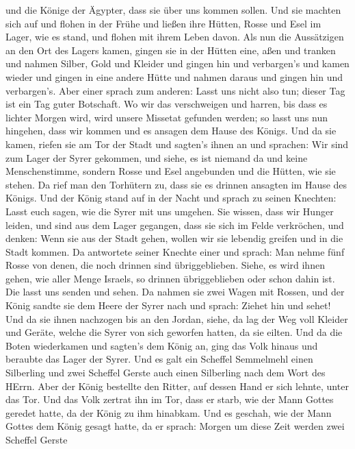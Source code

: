 und die Könige der Ägypter, dass sie über uns kommen sollen.
 Und sie machten sich auf und flohen in der Frühe und ließen
ihre Hütten, Rosse und Esel im Lager, wie es stand, und flohen mit ihrem
Leben davon.  Als nun die Aussätzigen an den Ort des Lagers
kamen, gingen sie in der Hütten eine, aßen und tranken und nahmen
Silber, Gold und Kleider und gingen hin und verbargen's und kamen wieder
und gingen in eine andere Hütte und nahmen daraus und gingen hin und
verbargen's.  Aber einer sprach zum anderen: Lasst uns nicht
also tun; dieser Tag ist ein Tag guter Botschaft. Wo wir das
verschweigen und harren, bis dass es lichter Morgen wird, wird unsere
Missetat gefunden werden; so lasst uns nun hingehen, dass wir kommen und
es ansagen dem Hause des Königs.  Und da sie kamen, riefen
sie am Tor der Stadt und sagten's ihnen an und sprachen: Wir sind zum
Lager der Syrer gekommen, und siehe, es ist niemand da und keine
Menschenstimme, sondern Rosse und Esel angebunden und die Hütten, wie
sie stehen.  Da rief man den Torhütern zu, dass sie es
drinnen ansagten im Hause des Königs.  Und der König stand
auf in der Nacht und sprach zu seinen Knechten: Lasst euch sagen, wie
die Syrer mit uns umgehen. Sie wissen, dass wir Hunger leiden, und sind
aus dem Lager gegangen, dass sie sich im Felde verkröchen, und denken:
Wenn sie aus der Stadt gehen, wollen wir sie lebendig greifen und in die
Stadt kommen.  Da antwortete seiner Knechte einer und
sprach: Man nehme fünf Rosse von denen, die noch drinnen sind
übriggeblieben. Siehe, es wird ihnen gehen, wie aller Menge Israels, so
drinnen übriggeblieben oder schon dahin ist. Die lasst uns senden und
sehen.  Da nahmen sie zwei Wagen mit Rossen, und der König
sandte sie dem Heere der Syrer nach und sprach: Ziehet hin und sehet!
 Und da sie ihnen nachzogen bis an den Jordan, siehe, da
lag der Weg voll Kleider und Geräte, welche die Syrer von sich geworfen
hatten, da sie eilten. Und da die Boten wiederkamen und sagten's dem
König an,  ging das Volk hinaus und beraubte das Lager der
Syrer. Und es galt ein Scheffel Semmelmehl einen Silberling und zwei
Scheffel Gerste auch einen Silberling nach dem Wort des HErrn.
 Aber der König bestellte den Ritter, auf dessen Hand er
sich lehnte, unter das Tor. Und das Volk zertrat ihn im Tor, dass er
starb, wie der Mann Gottes geredet hatte, da der König zu ihm hinabkam.
 Und es geschah, wie der Mann Gottes dem König gesagt
hatte, da er sprach: Morgen um diese Zeit werden zwei Scheffel Gerste
